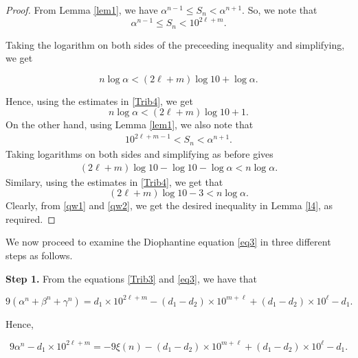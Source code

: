 \documentclass[10pt,a4paper]{article}
\begin{document}
\begin{proof}
\noindent From Lemma  \ref{lem1}, we have $\alpha^{n-1} \le  S_n <  \alpha^{n+1}$. So, we note that 
\begin{equation*}
\alpha^{n-1} \le  S_n < 10^{2\ell + m}.
\end{equation*}

\noindent Taking the logarithm on both sides of the preceeding inequality and simplifying,  we get 

\begin{equation*}
n \log \alpha < (2\ell + m) \log 10 + \log \alpha.
\end{equation*}

\noindent Hence, using the estimates in \eqref{Trib4}, we get
\begin{equation}\label{qw1}
n \log \alpha < (2\ell + m) \log 10 + 1. 
\end{equation}
\noindent
On the other hand, using Lemma \ref{lem1},  we also note that 
\begin{align*}
10^{2\ell + m -1} < S_n <  \alpha^{n+1}.
\end{align*}
Taking logarithms on both sides and simplifying as before gives
\begin{align*}
(2\ell +m)\log 10-\log 10 - \log \alpha < n\log \alpha.
\end{align*}
Similary, using the estimates in \eqref{Trib4}, we get that
\begin{equation}\label{qw2}
(2\ell +m)\log 10-3 < n\log \alpha.
\end{equation}
Clearly, from \eqref{qw1} and \eqref{qw2}, we get the desired inequality in Lemma \ref{l4}, as required.
\end{proof}

\noindent We now proceed to examine the Diophantine equation \eqref{eq3} in three different steps as follows.

\noindent \textbf{Step 1.} From the equations \eqref{Trib3} and \eqref{eq3}, we have that

\begin{equation*}
9(\alpha^n +  \beta^n +  \gamma^n )= d_1 \times 10^{2\ell + m} - (d_1-d_2)\times 10^{m+\ell} + (d_1-d_2)\times 10^\ell - d_1.
\end{equation*}

\noindent Hence,

\begin{equation*}
9 \alpha^n  - d_1 \times 10^{2\ell + m} = -9\xi(n) - (d_1-d_2)\times 10^{m+\ell} + (d_1-d_2)\times 10^\ell - d_1.
\end{equation*}
\end{document}
